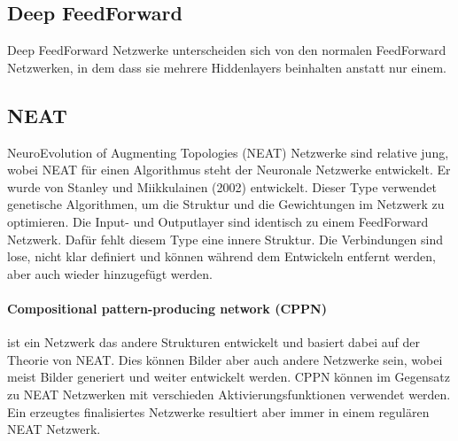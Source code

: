 
\subsection{Deep FeedForward}
\label{subsec:DeepFeedForward}

Deep FeedForward Netzwerke unterscheiden sich von den normalen FeedForward Netzwerken, in dem dass sie mehrere Hiddenlayers beinhalten anstatt nur einem.

\subsection{NEAT}

NeuroEvolution of Augmenting Topologies (NEAT) Netzwerke sind relative jung, wobei NEAT für einen Algorithmus steht der Neuronale Netzwerke entwickelt.
Er wurde von Stanley und Miikkulainen (2002) entwickelt. 
Dieser Type verwendet genetische Algorithmen, um die Struktur und die Gewichtungen im Netzwerk zu optimieren.
Die Input- und Outputlayer sind identisch zu einem FeedForward Netzwerk.
Dafür fehlt diesem Type eine innere Struktur. 
Die Verbindungen sind lose, nicht klar definiert und können während dem Entwickeln entfernt werden, aber auch wieder hinzugefügt werden.


\paragraph{Compositional pattern-producing network (CPPN)} ist ein Netzwerk das andere Strukturen entwickelt und basiert dabei auf der Theorie von NEAT. 
Dies können Bilder aber auch andere Netzwerke sein, wobei meist Bilder generiert und weiter entwickelt werden.
CPPN können im Gegensatz zu NEAT Netzwerken mit verschieden Aktivierungsfunktionen verwendet werden.
Ein erzeugtes finalisiertes Netzwerke resultiert aber immer in einem regulären NEAT Netzwerk.


